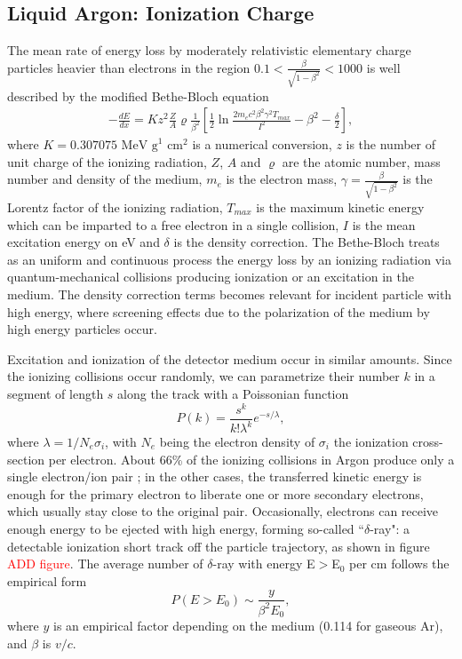 \subsection{Liquid Argon: Ionization Charge}\label{sec:charge}
The mean rate of energy loss by moderately relativistic elementary charge particles heavier than electrons in the region $0.1 < \frac{\beta}{\sqrt{1-\beta^2}} < 1000$ is well described by the modified Bethe-Bloch \cite{BB} equation
\begin{eqnarray*}
			- \frac{dE}{dx} = K z^2 \frac{Z}{A} \varrho \frac{1}{\beta^2} \left[ \frac{1}{2} \ln{\frac{2 m_e c^2 \beta^2 \gamma^2 T_{max}}{I^2}} - \beta^2 - \frac{\delta}{2}\right] ,
			\label{eq:BB}
\end{eqnarray*}
where $K = 0.307 075 \text{ MeV g}^1\text{ cm}^2$ is a numerical conversion, $z$ is the number of unit charge of the ionizing radiation, $Z$, $A$  and $\varrho$ are the atomic number, mass number and density of the medium,  $m_e$  is the electron mass, $\gamma = \frac{\beta}{\sqrt{1-\beta^2}} $ is the Lorentz factor of the ionizing radiation,  $T_{max}$ is the maximum kinetic energy which can be
imparted to a free electron in a single collision, $I$ is the mean excitation energy on eV and  $\delta$ is the  density correction. The Bethe-Bloch treats as an uniform and continuous process the energy loss by an ionizing radiation via quantum-mechanical collisions producing ionization or an excitation in the medium. The density correction  terms becomes relevant for incident particle with high energy, where screening effects due to the polarization of the medium by high energy particles occur.

Excitation and ionization of the detector medium occur in similar amounts. Since the ionizing collisions occur randomly, we can parametrize their number $k$ in a segment of length $s$ along the track  with a Poissonian function
\begin{equation}
P(k) = \frac{s^k}{k! \lambda^k} e^{-s/ \lambda }, 
\end{equation}
where $\lambda = 1/N_{e}\sigma_i$, with $N_{e}$ being the electron density of $\sigma_i$ the ionization cross-section per electron.  About 66\% of the ionizing collisions in Argon produce only a single electron/ion pair \cite{0034-4885-73-11-116201}; in the other cases, the transferred kinetic energy is enough for the primary electron to liberate one or more secondary electrons, which usually stay close to the original pair.  
Occasionally, electrons can receive enough energy to be ejected with high energy, forming so-called ``$\delta$-ray": a detectable ionization short track off the particle trajectory, as shown in figure \textcolor{red}{ADD figure}. 
The average number of $\delta$-ray  with energy E$>$E$_0$ per cm follows the empirical form
\begin{equation}
P(E>E_0) \sim \frac{y}{\beta^2 E_0},
\end{equation}
where $y$ is an empirical factor depending on the medium (0.114 for  gaseous Ar), and $\beta$ is $v/c$.


